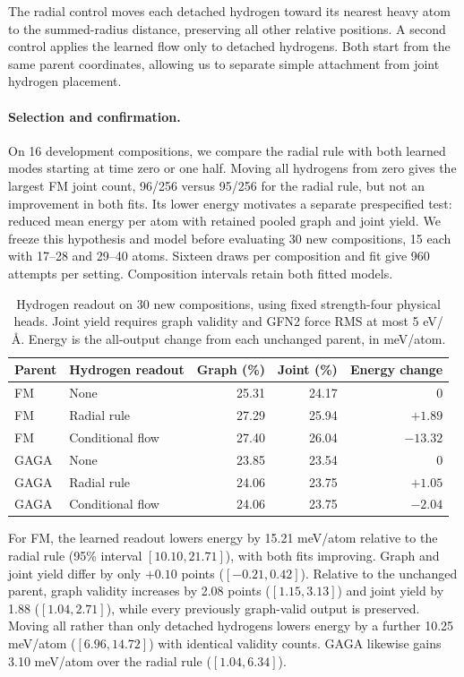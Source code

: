 The radial control moves each detached hydrogen toward its nearest heavy atom to the summed-radius distance, preserving all other relative positions. A second control applies the learned flow only to detached hydrogens. Both start from the same parent coordinates, allowing us to separate simple attachment from joint hydrogen placement.

\paragraph{Selection and confirmation.}
On 16 development compositions, we compare the radial rule with both learned modes starting at time zero or one half. Moving all hydrogens from zero gives the largest FM joint count, 96/256 versus 95/256 for the radial rule, but not an improvement in both fits. Its lower energy motivates a separate prespecified test: reduced mean energy per atom with retained pooled graph and joint yield. We freeze this hypothesis and model before evaluating 30 new compositions, 15 each with 17--28 and 29--40 atoms. Sixteen draws per composition and fit give 960 attempts per setting. Composition intervals retain both fitted models.

\begin{table}[htbp]
\centering\small
\caption{Hydrogen readout on 30 new compositions, using fixed strength-four physical heads. Joint yield requires graph validity and GFN2 force RMS at most 5 eV/\AA. Energy is the all-output change from each unchanged parent, in meV/atom.}
\begin{tabular}{llrrr}
\toprule
Parent & Hydrogen readout & Graph (\%) & Joint (\%) & Energy change\\
\midrule
FM & None &25.31&24.17&0\\
FM & Radial rule &27.29&25.94&$+1.89$\\
FM & Conditional flow &27.40&26.04&$-13.32$\\
GAGA & None &23.85&23.54&0\\
GAGA & Radial rule &24.06&23.75&$+1.05$\\
GAGA & Conditional flow &24.06&23.75&$-2.04$\\
\bottomrule
\end{tabular}\label{tab:hydrogen-readout}
\end{table}

For FM, the learned readout lowers energy by 15.21 meV/atom relative to the radial rule (95\% interval $[10.10,21.71]$), with both fits improving. Graph and joint yield differ by only $+0.10$ points ($[-0.21,0.42]$). Relative to the unchanged parent, graph validity increases by 2.08 points ($[1.15,3.13]$) and joint yield by 1.88 ($[1.04,2.71]$), while every previously graph-valid output is preserved. Moving all rather than only detached hydrogens lowers energy by a further 10.25 meV/atom ($[6.96,14.72]$) with identical validity counts. GAGA likewise gains 3.10 meV/atom over the radial rule ($[1.04,6.34]$).


